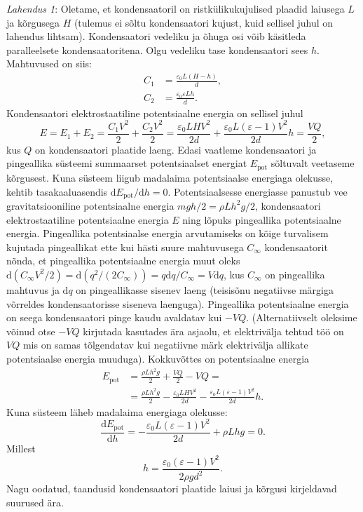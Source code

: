 \documentclass[10pt]{article}
\begin{document}
\solu
\textit{Lahendus 1}:
Oletame, et kondensaatoril on ristkülikukujulised plaadid laiusega $L$ ja kõrgusega $H$ (tulemus ei sõltu kondensaatori kujust, kuid sellisel juhul on lahendus lihtsam). Kondensaatori vedeliku ja õhuga osi võib käsitleda paralleelsete kondensaatoritena. Olgu vedeliku tase kondensaatori sees $h$. Mahtuvused on siis:
\begin{align*}
C_1 &= \frac{\varepsilon_0 L (H-h)}{d},\\
C_2 &= \frac{\varepsilon_0 \varepsilon L h}{d}.
\end{align*}
Kondensaatori elektrostaatiline potentsiaalne energia on sellisel juhul $$E = E_1 + E_2 = \frac{C_ 1 V^2}{2} + \frac{C_ 2 V^2}{2} = \frac{\varepsilon_0 L H V^2}{2d} + \frac{\varepsilon_0 L (\varepsilon - 1) V^2}{2d}h = \frac{VQ}{2},$$
kus $Q$ on kondensaatori plaatide laeng. Edasi vaatleme kondensaatori ja pingeallika süsteemi summaarset potentsiaalset energiat $E_\mathrm{pot}$ sõltuvalt veetaseme kõrgusest. Kuna süsteem liigub madalaima potentsiaalse energiaga olekusse, kehtib tasakaaluasendis $\mathrm{d} E_\mathrm{pot} / \mathrm{d}h = 0$. Potentsiaalsesse energiasse panustub vee gravitatsiooniline potentsiaalne energia $mgh/2 = \rho L h^2 g/2$, kondensaatori elektrostaatiline potentsiaalne energia $E$ ning lõpuks pingeallika potentsiaalne energia. Pingeallika potentsiaalse energia arvutamiseks on kõige turvalisem kujutada pingeallikat ette kui hästi suure mahtuvusega $C_\infty$ kondensaatorit nõnda, et pingeallika potentsiaalne energia muut oleks $\mathrm{d}(C_\infty V^2/2) = \mathrm{d}(q^2/(2C_\infty)) = q\mathrm{d}q/C_\infty = V\mathrm{d}q$, kus $C_\infty$ on pingeallika mahtuvus ja $\mathrm{d}q$ on pingeallikasse sisenev laeng (teisisõnu negatiivse märgiga võrreldes kondensaatorisse siseneva laenguga). Pingeallika potentsiaalne energia on seega kondensaatori pinge kaudu avaldatav kui $-VQ$. (Alternatiivselt oleksime võinud otse $-VQ$ kirjutada kasutades ära asjaolu, et elektrivälja tehtud töö on $VQ$ mis on samas tõlgendatav kui negatiivne märk elektrivälja allikate potentsiaalse energia muuduga). Kokkuvõttes on potentsiaalne energia
\begin{align*}
E_\mathrm{pot} &=  \frac{\rho L h^2 g}{2} + \frac{VQ}{2} - VQ =\\
&=\frac{\rho L h^2 g}{2} -\frac{\varepsilon_0 L H V^2}{2d} - \frac{\varepsilon_0 L (\varepsilon - 1) V^2}{2d}h.
\end{align*}
Kuna süsteem läheb madalaima energiaga olekusse:
\[
\frac{\mathrm{d}E_\mathrm{pot}}{\mathrm{d}h} = -\frac{\varepsilon_0 L (\varepsilon - 1) V^2}{2d} + \rho L h g = 0.
\]
Millest
\[
  h = \frac{\varepsilon_0 (\varepsilon - 1) V^2}{2 \rho g d^2}.
\]
Nagu oodatud, taandusid kondensaatori plaatide laiusi ja kõrgusi kirjeldavad suurused ära.
\end{document}
